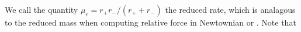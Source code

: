 We call the quantity \(\mu_r = r_+r_-/(r_+ + r_-)\) the reduced rate, which is analagous to the reduced mass when computing relative force in Newtownian or .  Note that